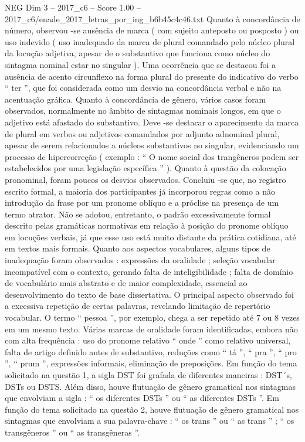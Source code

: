 \begin{textsample}{NEG Dim 3 – 2017\_c6 – Score 1.00 – 2017\_c6/enade\_2017\_letras\_por\_ing\_b6b45c4c46.txt}
Quanto à concordância de número, observou -se ausência de marca ( com sujeito anteposto ou posposto ) ou uso indevido ( uso inadequado da marca de plural comandado pelo núcleo plural da locução adjetiva, apesar de o substantivo que funciona como núcleo do sintagma nominal estar no singular ).
Uma ocorrência que se destacou foi a ausência de acento circunflexo na forma plural do presente do indicativo do verbo “ ter ”, que foi considerada como um desvio na concordância verbal e não na acentuação gráfica.
Quanto à concordância de gênero, vários casos foram observados, normalmente no âmbito de sintagmas nominais longos, em que o adjetivo está afastado do substantivo.
Deve -se destacar o aparecimento da marca de plural em verbos ou adjetivos comandados por adjunto adnominal plural, apesar de serem relacionados a núcleos substantivos no singular, evidenciando um processo de hipercorreção ( exemplo : “ O nome social dos trangêneros podem ser estabelecidos por uma legislação específica ” ).
Quanto à questão da colocação pronominal, foram poucos os desvios observados.
Concluiu -se que, no registro escrito formal, a maioria dos participantes já incorporou regras como a não introdução da frase por um pronome oblíquo e a próclise na presença de um termo atrator.
Não se adotou, entretanto, o padrão excessivamente formal descrito pelas gramáticas normativas em relação à posição do pronome oblíquo em locuções verbais, já que esse uso está muito distante da prática cotidiana, até em textos mais formais.
Quanto aos aspectos vocabulares, alguns tipos de inadequação foram observados : expressões da oralidade ; seleção vocabular incompatível com o contexto, gerando falta de inteligibilidade ; falta de domínio de vocabulário mais abstrato e de maior complexidade, essencial ao desenvolvimento do texto de base dissertativa.
O principal aspecto observado foi a excessiva repetição de certas palavras, revelando limitação de repertório vocabular.
O termo “ pessoa ”, por exemplo, chega a ser repetido até 7 ou 8 vezes em um mesmo texto.
Várias marcas de oralidade foram identificadas, embora não com alta frequência : uso do pronome relativo “ onde ” como relativo universal, falta de artigo definido antes de substantivo, reduções como “ tá ”, “ pra ”, “ pro ”, “ prum ”, expressões informais, eliminação de preposições.
Em função do tema solicitado na questão 1, a sigla DST foi grafada de diferentes maneiras : DST´s, DSTs ou DSTS.
Além disso, houve flutuação de gênero gramatical nos sintagmas que envolviam a sigla : “ os diferentes DSTs ” ou “ as diferentes DSTs ”.
Em função do tema solicitado na questão 2, houve flutuação de gênero gramatical nos sintagmas que envolviam a sua palavra-chave : “ os trans ” ou “ as trans ” ; “ os transgêneros ” ou “ as transgêneras ”.

\end{textsample}
